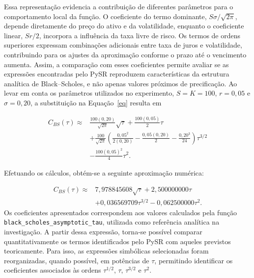 Essa representação evidencia a contribuição de diferentes parâmetros para o comportamento local da função. O coeficiente do termo dominante, $S\sigma/\sqrt{2\pi}$, depende diretamente do preço do ativo e da volatilidade, enquanto o coeficiente linear, $Sr/2$, incorpora a influência da taxa livre de risco. Os termos de ordens superiores expressam combinações adicionais entre taxa de juros e volatilidade, contribuindo para os ajustes da aproximação conforme o prazo até o vencimento aumenta. Assim, a comparação com esses coeficientes permite avaliar se as expressões encontradas pelo PySR reproduzem características da estrutura analítica de Black--Scholes, e não apenas valores próximos de precificação. Ao levar em conta os parâmetros utilizados no experimento, $S=K=100$, $r=0{,}05$ e $\sigma=0{,}20$, a substituição na Equação~\ref{eq} resulta em

\begin{equation}
\label{eq:tau_teorico_numerico}
\begin{aligned}
C_{BS}(\tau) \approx{}&
\frac{100(0{,}20)}{\sqrt{2\pi}}\sqrt{\tau}
+\frac{100(0{,}05)}{2}\tau\\
&+\frac{100}{\sqrt{2\pi}}
\left(
\frac{0{,}05^2}{2(0{,}20)}
-\frac{0{,}05(0{,}20)}{2}
-\frac{0{,}20^3}{24}
\right)\tau^{3/2}\\
&-\frac{100(0{,}05)^2}{4}\tau^2.
\end{aligned}
\end{equation}

Efetuando os cálculos, obtém-se a seguinte aproximação numérica:

\begin{equation}
\label{eq:tau_teorico_BS_numerico}
\boxed{
\begin{aligned}
C_{BS}(\tau)\approx{}&
7{,}978845608\sqrt{\tau}
+2{,}500000000\tau\\
&+0{,}036569709\tau^{3/2}
-0{,}062500000\tau^2.
\end{aligned}
}
\end{equation}
Os coeficientes apresentados correspondem aos valores calculados pela função \texttt{black\_scholes\_asymptotic\_tau}, utilizada como referência analítica na investigação. A partir dessa expressão, torna-se possível comparar quantitativamente os termos identificados pelo PySR com aqueles previstos teoricamente. Para isso, as expressões simbólicas selecionadas foram reorganizadas, quando possível, em potências de $\tau$, permitindo identificar os coeficientes associados às ordens $\tau^{1/2}$, $\tau$, $\tau^{3/2}$ e $\tau^2$.

